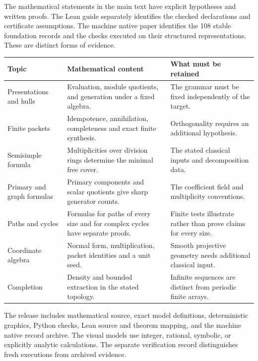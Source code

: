 
The mathematical statements in the main text have explicit hypotheses and written proofs. The Lean guide separately identifies the checked declarations and certificate assumptions. The machine native paper identifies the 108 stable foundation records and the checks executed on their structured representations. These are distinct forms of evidence.

{\small\begin{tabularx}{\linewidth}{@{}>{\raggedright\arraybackslash}p{.23\linewidth}Y>{\raggedright\arraybackslash}p{.25\linewidth}@{}}\toprule
\textbf{Topic} & \textbf{Mathematical content} & \textbf{What must be retained}\\\midrule
Presentations and hulls & Evaluation, module quotients, and generation under a fixed algebra. & The grammar must be fixed independently of the target.\\
Finite packets & Idempotence, annihilation, completeness and exact finite synthesis. & Orthogonality requires an additional hypothesis.\\
Semisimple formula & Multiplicities over division rings determine the minimal free cover. & The stated classical inputs and decomposition data.\\
Primary and graph formulas & Primary components and scalar quotients give sharp generator counts. & The coefficient field and multiplicity conventions.\\
Paths and cycles & Formulas for paths of every size and for complex cycles have separate proofs. & Finite tests illustrate rather than prove claims for every size.\\
Coordinate algebra & Normal form, multiplication, packet identities and a unit seed. & Smooth projective geometry needs additional classical input.\\
Completion & Density and bounded extraction in the stated topology. & Infinite sequences are distinct from periodic finite arrays.\\\bottomrule\end{tabularx}}

The release includes mathematical source, exact model definitions, deterministic graphics, Python checks, Lean source and theorem mapping, and the machine native record archive. The visual models use integer, rational, symbolic, or explicitly analytic calculations. The separate verification record distinguishes fresh executions from archived evidence.

